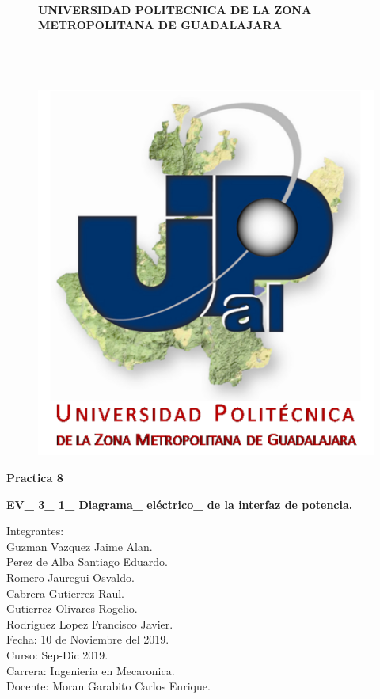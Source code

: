 \documentclass[12pt,letterpaper]{article}
\begin{document}
\begin{figure}[h!]
\centering
\paragraph{UNIVERSIDAD POLITECNICA DE LA ZONA METROPOLITANA DE GUADALAJARA}
\

\
\includegraphics[scale=0.8]{Upzmg.png} 
\end{figure}
\begin{center}
\textbf{\LARGE Practica 8}\\
\end{center}
\begin{center}
\textbf{\LARGE EV\_ 3\_ 1\_ Diagrama\_ eléctrico\_ de la interfaz de potencia.}
\end{center}


\large{Integrantes:}\\
\large{Guzman Vazquez Jaime Alan.\\
Perez de Alba Santiago Eduardo.\\
Romero Jauregui Osvaldo.\\
Cabrera Gutierrez Raul.\\
Gutierrez Olivares Rogelio.\\
Rodriguez Lopez Francisco Javier.\\

Fecha: 10 de Noviembre del 2019.\\

Curso: Sep-Dic 2019.\\

Carrera: Ingenieria en Mecaronica.\\

Docente: Moran Garabito Carlos Enrique.\\}
\end{document}
